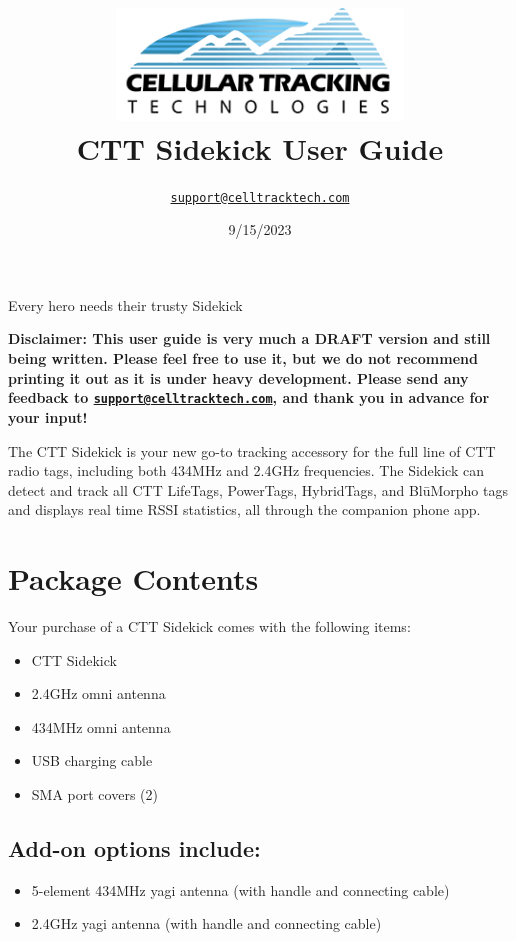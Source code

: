 \documentclass[
]{article}
\title{\includegraphics[width=3in,height=\textheight]{./images/ctt_logo.png}\\
CTT Sidekick User Guide}
\author{\href{mailto:support@celltracktech.com}{\nolinkurl{support@celltracktech.com}}}
\date{9/15/2023}
\providecommand{\tightlist}{%
  \setlength{\itemsep}{0pt}\setlength{\parskip}{0pt}}
\begin{document}
\maketitle

{
\setcounter{tocdepth}{2}
\tableofcontents
}
\newpage

Every hero needs their trusty Sidekick

\textbf{Disclaimer: This user guide is very much a DRAFT version and
still being written. Please feel free to use it, but we do not recommend
printing it out as it is under heavy development. Please send any
feedback to
\href{mailto:support@celltracktech.com}{\nolinkurl{support@celltracktech.com}},
and thank you in advance for your input!}

The CTT Sidekick is your new go-to tracking accessory for the full line
of CTT radio tags, including both 434MHz and 2.4GHz frequencies. The
Sidekick can detect and track all CTT LifeTags, PowerTags, HybridTags,
and BlūMorpho tags and displays real time RSSI statistics, all through
the companion phone app.

\hypertarget{package-contents}{%
\section{Package Contents}\label{package-contents}}

Your purchase of a CTT Sidekick comes with the following items:

\begin{itemize}
\tightlist
\item
  CTT Sidekick
\item
  2.4GHz omni antenna
\item
  434MHz omni antenna
\item
  USB charging cable
\item
  SMA port covers (2)
\end{itemize}

\hypertarget{add-on-options-include}{%
\subsection{Add-on options include:}\label{add-on-options-include}}

\begin{itemize}
\tightlist
\item
  5-element 434MHz yagi antenna (with handle and connecting cable)
\item
  2.4GHz yagi antenna (with handle and connecting cable)
\end{itemize}
\end{document}
